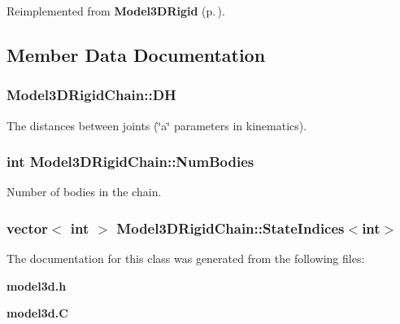 Reimplemented from {\bf Model3DRigid} {\rm (p.\,\pageref{classModel3DRigid_a3})}.

\subsection{Member Data Documentation}
\subsubsection{ Model3DRigid\-Chain::DH}\label{classModel3DRigidChain_m1}


The distances between joints (\char`\"{}a\char`\"{} parameters in kinematics).

\subsubsection{\setlength{\rightskip}{0pt plus 5cm}int Model3DRigid\-Chain::Num\-Bodies}\label{classModel3DRigidChain_m0}


Number of bodies in the chain.

\subsubsection{\setlength{\rightskip}{0pt plus 5cm}vector$<$ int $>$ Model3DRigid\-Chain::State\-Indices$<$int$>$}\label{classModel3DRigidChain_m2}




The documentation for this class was generated from the following files:\begin{CompactItemize}
\item 
{\bf model3d.h}\item 
{\bf model3d.C}\end{CompactItemize}
